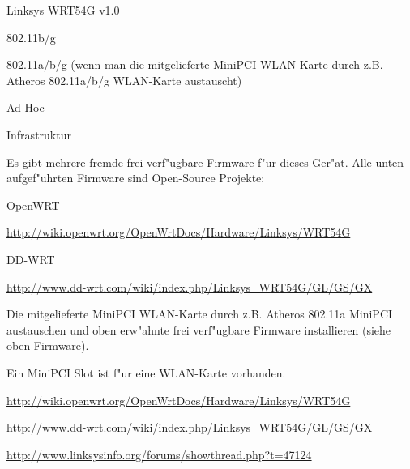 %
%
\begin{wlandevice}{Linksys WRT54G v1.0}


\begin{wlanieeestandard}
\item 802.11b/g
\item 802.11a/b/g (wenn man die mitgelieferte MiniPCI WLAN-Karte
durch z.B. Atheros 802.11a/b/g WLAN-Karte austauscht)
\end{wlanieeestandard}

\begin{wlanmode}
\item Ad-Hoc
\item Infrastruktur
\end{wlanmode}

\begin{wlanfirmware}
\item
Es gibt mehrere fremde frei verf"ugbare Firmware f"ur dieses Ger"at.
Alle unten aufgef"uhrten Firmware sind Open-Source Projekte:

OpenWRT

\url{http://wiki.openwrt.org/OpenWrtDocs/Hardware/Linksys/WRT54G}

DD-WRT

\url{http://www.dd-wrt.com/wiki/index.php/Linksys_WRT54G/GL/GS/GX}
\end{wlanfirmware}


\begin{wlaninstall}
\item
Die mitgelieferte MiniPCI WLAN-Karte durch z.B. Atheros 802.11a MiniPCI
austauschen und oben erw"ahnte frei verf"ugbare Firmware installieren
(siehe oben Firmware).
\end{wlaninstall}

\begin{wlanextrainfo}
\item
Ein MiniPCI Slot ist f"ur eine WLAN-Karte vorhanden.
\end{wlanextrainfo}

\begin{wlanlink}
\item \url{http://wiki.openwrt.org/OpenWrtDocs/Hardware/Linksys/WRT54G}
\item \url{http://www.dd-wrt.com/wiki/index.php/Linksys_WRT54G/GL/GS/GX}
\item \url{http://www.linksysinfo.org/forums/showthread.php?t=47124}
\end{wlanlink}

\end{wlandevice}

